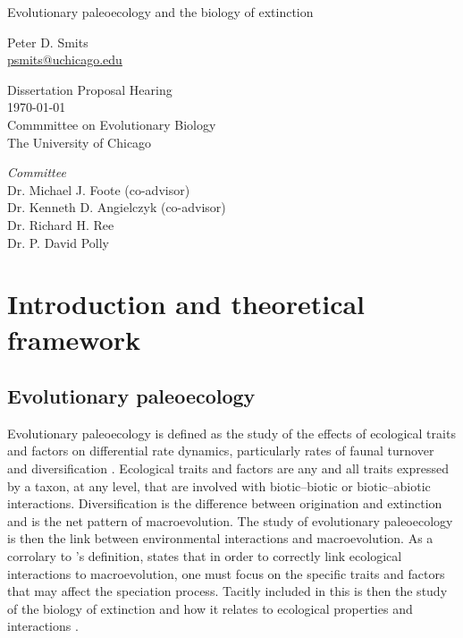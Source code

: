 \documentclass[12pt,letterpaper]{article}
\begin{document}
\setcounter{secnumdepth}{0}

\begin{titlepage}
  \begin{center}
    \huge{Evolutionary paleoecology and the biology of extinction}

    \vspace{1.5cm}

    \large{Peter D. Smits \\}
    \footnotesize{\href{mailto:psmits@uchicago.edu}{psmits@uchicago.edu}}

    \vspace{1.5cm}

    Dissertation Proposal Hearing \\
    \today \\
    Commmittee on Evolutionary Biology \\
    The University of Chicago

    \vspace{1.5cm}

    \textit{Committee} \\
    Dr. Michael J. Foote (co-advisor) \\
    Dr. Kenneth D. Angielczyk (co-advisor) \\
    Dr. Richard H. Ree \\
    Dr. P. David Polly
  \end{center}
\end{titlepage}

\linenumbers
\modulolinenumbers[2]


\section{Introduction and theoretical framework}

\subsection{Evolutionary paleoecology}
Evolutionary paleoecology is defined as the study of the effects of ecological traits and factors on differential rate dynamics, particularly rates of faunal turnover and diversification \citep{Kitchell1985a}. Ecological traits and factors are any and all traits expressed by a taxon, at any level, that are involved with biotic--biotic or biotic--abiotic interactions. Diversification is the difference between origination and extinction and is the net pattern of macroevolution. The study of evolutionary paleoecology is then the link between environmental interactions and macroevolution. As a corrolary to \citet{Kitchell1985a}'s definition, \citet{Allmon1994} states that in order to correctly link ecological interactions to macroevolution, one must focus on the specific traits and factors that may affect the speciation process. Tacitly included in this is then the study of the biology of extinction and how it relates to ecological properties and interactions \citep{Kitchell1990}.
\end{document}

